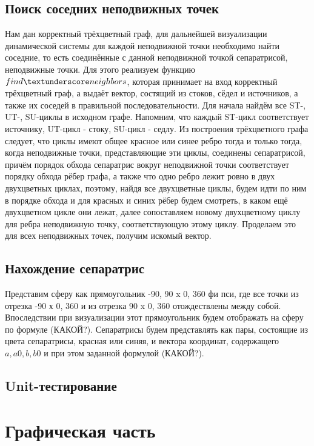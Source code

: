 	\subsection{Поиск соседних неподвижных точек}
	Нам дан корректный трёхцветный граф, для дальнейшей визуализации динамической системы для каждой неподвижной точки необходимо найти соседние, то есть соединённые с данной неподвижной точкой сепаратрисой, неподвижные точки. Для этого реализуем функцию $find \textunderscore neighbors$, которая принимает на вход корректный трёхцветный граф, а выдаёт вектор, состящий из стоков, сёдел и источников, а также их соседей в правильной последовательности.
	Для начала найдём все ST-, UT-, SU-циклы в исходном графе. Напомним, что каждый ST-цикл соответствует источнику, UT-цикл - стоку, SU-цикл - седлу. Из построения трёхцветного графа следует, что циклы имеют общее красное или синее ребро тогда и только тогда, когда неподвижные точки, представляющие эти циклы, соединены сепаратрисой, причём порядок обхода сепаратрис вокруг неподвижной точки соответствует порядку обхода рёбер графа, а также что одно ребро лежит ровно в двух двухцветных циклах, поэтому, найдя все двухцветные циклы, будем идти по ним в порядке обхода и для красных и синих рёбер будем смотреть, в каком ещё двухцветном цикле они лежат, далее сопоставляем новому двухцветному циклу для ребра неподвижную точку, соответствующую этому циклу. Проделаем это для всех неподвижных точек, получим искомый вектор.
	\subsection{Нахождение сепаратрис}
	Представим сферу как прямоугольник -90, 90 x 0, 360 фи пси, где все точки из отрезка -90 х 0, 360 и из отрезка 90 x 0, 360 отождествлены между собой. Впоследствии при визуализации этот прямоугольник будем отображать на сферу по формуле (КАКОЙ?). Сепаратрисы будем представлять как пары, состоящие из цвета сепаратрисы, красная или синяя, и вектора координат, содержащего $a, a0, b, b0$ и при этом заданной формулой (КАКОЙ?). 
	
	\subsection{Unit-тестирование}
	\section{Графическая часть}
